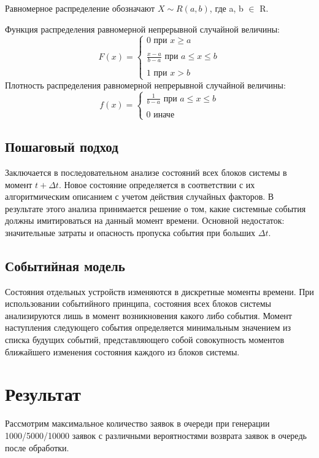 \documentclass[12pt,a4paper,oneside]{report}
\begin{document}
Равномерное распределение обозначают $X \sim R(a, b)$, где a, b $\in$ R. 

Функция распределения равномерной непрерывной случайной величины:
\begin{equation}
    F(x) = \begin{cases}
            0 \text{ при } x \geq a\\\\
            \frac{x-a}{b-a} \text{ при } a \leq x \leq b\\\\
            1 \text{ при } x > b
    \end{cases}
\end{equation}
Плотность распределения равномерной непрерывной случайной величины:
\begin{equation}
    f(x) = \begin{cases}
            \frac{1}{b-a} \text{ при } a \leq x \leq b\\\\
            0 \text{ иначе }
    \end{cases}
\end{equation}
\clearpage


\subsection*{Пошаговый подход}
\quad Заключается в последовательном анализе состояний всех блоков системы в момент $t + \Delta t$. Новое состояние определяется в соответствии с их алгоритмическим описанием с учетом действия случайных факторов. В результате этого анализа принимается решение о том, какие системные события должны имитироваться на данный момент времени. Основной недостаток: значительные затраты и опасность пропуска события при больших $\Delta t$.


\subsection*{Событийная модель}
\quad Состояния отдельных устройств изменяются в дискретные моменты времени. При использовании событийного принципа, состояния всех блоков системы анализируются лишь в момент возникновения какого либо события. Момент наступления следующего события определяется минимальным значением из списка будущих событий, представляющего собой совокупность моментов ближайшего изменения состояния каждого из блоков системы.

\section*{Результат}
\quad Рассмотрим максимальное количество заявок в очереди при генерации 1000/5000/10000 заявок с различными вероятностями возврата заявок  в очередь после обработки. 
\end{document}
